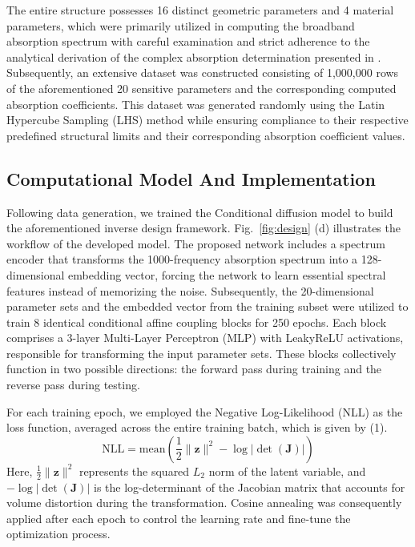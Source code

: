 \documentclass[conference]{IEEEtran}
\begin{document}
The entire structure possesses 16 distinct geometric parameters and 4 material parameters, which were primarily utilized in computing the broadband absorption spectrum with careful examination and strict adherence to the analytical derivation of the complex absorption determination presented in \cite{gao2025ondemand}. Subsequently, an extensive dataset was constructed consisting of 1,000,000 rows of the aforementioned 20 sensitive parameters and the corresponding computed absorption coefficients. This dataset was generated randomly using the Latin Hypercube Sampling (LHS) method while ensuring compliance to their respective predefined structural limits and their corresponding absorption coefficient values.

\vspace{-1ex}
\subsection{Computational Model And Implementation}
Following data generation, we trained the Conditional diffusion model to build the aforementioned inverse design framework. Fig.~\ref{fig:design} (d) illustrates the workflow of the developed model. The proposed network includes a spectrum encoder that transforms the 1000-frequency absorption spectrum into a 128-dimensional embedding vector, forcing the network to learn essential spectral features instead of memorizing the noise. Subsequently, the 20-dimensional parameter sets and the embedded vector from the training subset were utilized to train 8 identical conditional affine coupling blocks for 250 epochs. Each block comprises a 3-layer Multi-Layer Perceptron (MLP) with LeakyReLU activations, responsible for transforming the input parameter sets. These blocks collectively function in two possible directions: the forward pass during training and the reverse pass during testing. 

For each training epoch, we employed the Negative Log-Likelihood (NLL) as the loss function, averaged across the entire training batch, which is given by (1).
\begin{equation}
    \text{NLL} = \text{mean} \left( \frac{1}{2} \|\mathbf{z}\|^2 - \log |\det(\mathbf{J})| \right)
\end{equation}
Here, $\frac{1}{2} \|\mathbf{z}\|^2$ represents the squared $L_2$ norm of the latent variable, and $-\log |\det(\mathbf{J})|$ is the log-determinant of the Jacobian matrix that accounts for volume distortion during the transformation. Cosine annealing was consequently applied after each epoch to control the learning rate and fine-tune the optimization process. 
\end{document}
